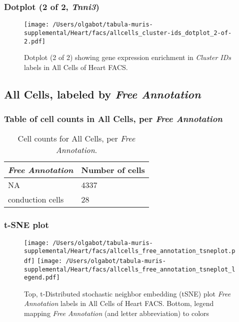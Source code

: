 \clearpage

\subsubsection{Dotplot (2 of 2, \emph{Tnni3})}
\begin{figure}[h]
\centering
\texttt{[image: /Users/olgabot/tabula-muris-supplemental/Heart/facs/allcells\_cluster-ids\_dotplot\_2-of-2.pdf]}

\caption{ Dotplot (2 of 2)  showing gene expression enrichment in \emph{Cluster IDs} labels in All Cells of Heart FACS. }
\end{figure}


\clearpage

\subsection{All Cells, labeled by \emph{Free Annotation}}
\subsubsection{Table of cell counts in All Cells, per \emph{Free Annotation}}\begin{table}[h]
\centering
\label{my-label}
\begin{tabular}{@{}ll@{}}
\toprule

\emph{Free Annotation}& Number of cells \\ \midrule
NA & 4337 \\

conduction cells & 28 \\
\bottomrule
\end{tabular}
\caption{Cell counts for All Cells, per \emph{Free Annotation}.}
\end{table}

\clearpage
\subsubsection{t-SNE plot}
\begin{figure}[h]
\centering
\texttt{[image: /Users/olgabot/tabula-muris-supplemental/Heart/facs/allcells\_free\_annotation\_tsneplot.pdf]}
\texttt{[image: /Users/olgabot/tabula-muris-supplemental/Heart/facs/allcells\_free\_annotation\_tsneplot\_legend.pdf]}
\caption{Top, t-Distributed stochastic neighbor embedding (tSNE) plot  \emph{Free Annotation} labels in All Cells of Heart FACS. Bottom, legend mapping \emph{Free Annotation} (and letter abbreviation) to colors}
\end{figure}



